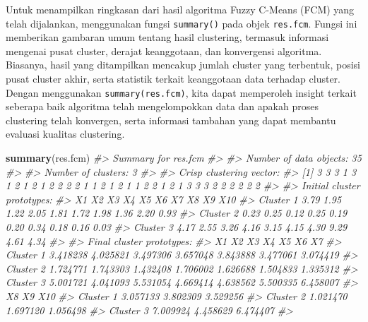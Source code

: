 \documentclass[
  oneside]{book}
\newenvironment{Shaded}{\begin{snugshade}}{\end{snugshade}}
\newcommand{\CommentTok}[1]{\textcolor[rgb]{0.56,0.35,0.01}{\textit{#1}}}
\newcommand{\FunctionTok}[1]{\textcolor[rgb]{0.13,0.29,0.53}{\textbf{#1}}}
\newcommand{\NormalTok}[1]{#1}
\begin{document}
Untuk menampilkan ringkasan dari hasil algoritma Fuzzy C-Means (FCM) yang telah dijalankan, menggunakan fungsi \texttt{summary()} pada objek \texttt{res.fcm}. Fungsi ini memberikan gambaran umum tentang hasil clustering, termasuk informasi mengenai pusat cluster, derajat keanggotaan, dan konvergensi algoritma. Biasanya, hasil yang ditampilkan mencakup jumlah cluster yang terbentuk, posisi pusat cluster akhir, serta statistik terkait keanggotaan data terhadap cluster. Dengan menggunakan \texttt{summary(res.fcm)}, kita dapat memperoleh insight terkait seberapa baik algoritma telah mengelompokkan data dan apakah proses clustering telah konvergen, serta informasi tambahan yang dapat membantu evaluasi kualitas clustering.

\begin{Shaded}
\begin{Highlighting}[]
\FunctionTok{summary}\NormalTok{(res.fcm)}
\CommentTok{\#\textgreater{} Summary for \textquotesingle{}res.fcm\textquotesingle{}}
\CommentTok{\#\textgreater{} }
\CommentTok{\#\textgreater{} Number of data objects:  35 }
\CommentTok{\#\textgreater{} }
\CommentTok{\#\textgreater{} Number of clusters:  3 }
\CommentTok{\#\textgreater{} }
\CommentTok{\#\textgreater{} Crisp clustering vector:}
\CommentTok{\#\textgreater{}  [1] 3 3 3 1 3 1 2 1 2 1 2 2 2 2 1 1 2 1 2 1 1 2 2 1 2 1 3 3 3 2 2 2 2 2 2}
\CommentTok{\#\textgreater{} }
\CommentTok{\#\textgreater{} Initial cluster prototypes:}
\CommentTok{\#\textgreater{}             X1   X2   X3   X4   X5   X6   X7   X8   X9  X10}
\CommentTok{\#\textgreater{} Cluster 1 3.79 1.95 1.22 2.05 1.81 1.72 1.98 1.36 2.20 0.93}
\CommentTok{\#\textgreater{} Cluster 2 0.23 0.25 0.12 0.25 0.19 0.20 0.34 0.18 0.16 0.03}
\CommentTok{\#\textgreater{} Cluster 3 4.17 2.55 3.26 4.16 3.15 4.15 4.30 9.29 4.61 4.34}
\CommentTok{\#\textgreater{} }
\CommentTok{\#\textgreater{} Final cluster prototypes:}
\CommentTok{\#\textgreater{}                 X1       X2       X3       X4       X5       X6       X7}
\CommentTok{\#\textgreater{} Cluster 1 3.418238 4.025821 3.497306 3.657048 3.843888 3.477061 3.074419}
\CommentTok{\#\textgreater{} Cluster 2 1.724771 1.743303 1.432408 1.706002 1.626688 1.504833 1.335312}
\CommentTok{\#\textgreater{} Cluster 3 5.001721 4.041093 5.531054 4.669414 4.638562 5.500335 6.458007}
\CommentTok{\#\textgreater{}                 X8       X9      X10}
\CommentTok{\#\textgreater{} Cluster 1 3.057133 3.802309 3.529256}
\CommentTok{\#\textgreater{} Cluster 2 1.021470 1.697120 1.056498}
\CommentTok{\#\textgreater{} Cluster 3 7.009924 4.458629 6.474407}
\CommentTok{\#\textgreater{} }

\end{Highlighting}
\end{Shaded}
\end{document}

